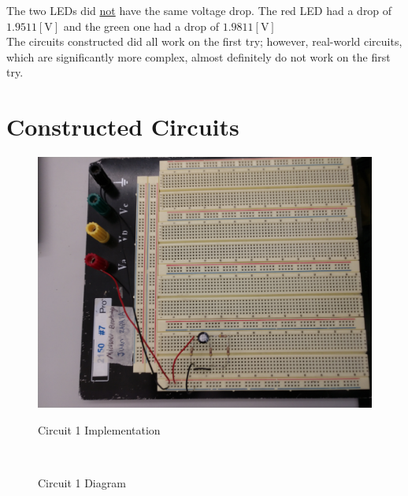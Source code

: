 \documentclass[
	letterpaper, %
	10pt, %
]{CSUniSchoolLabReport}
\begin{document}
The two LEDs did \underline{not} have the same voltage drop. The red LED had a drop of $1.9511[\si{\volt}]$ and the green one had a drop of $1.9811[\si{\volt}]$\\

The circuits constructed did all work on the first try; however, real-world circuits, which are significantly more complex, almost definitely do not work on the first try.

\section{Constructed Circuits}

\begin{multicols}{2}

\begin{figure}[H]
  \centering
  \includegraphics[width=.45\textwidth]{Figures/L1C1.jpg}\\
  \caption{Circuit 1 Implementation}
  \label{fig:1}
\end{figure}\\

\begin{figure}[H]
  \centering
  
  \caption{Circuit 1 Diagram}
  \label{fig:2}
\end{figure}

\end{multicols}
\end{document}
